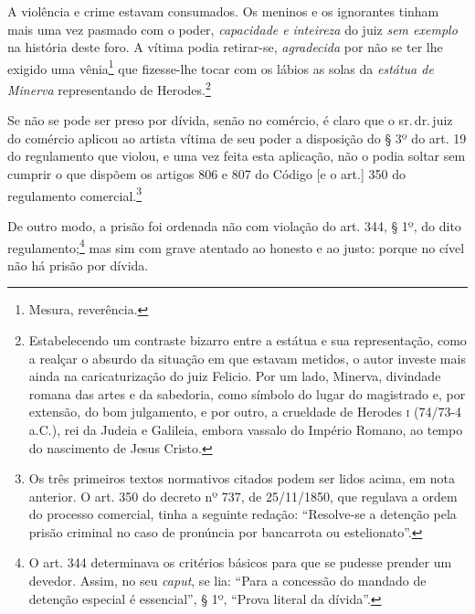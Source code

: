A violência e crime estavam consumados. Os meninos e os ignorantes
tinham mais uma vez pasmado com o poder, \emph{capacidade e}
\emph{inteireza} do juiz \emph{sem exemplo} na história deste foro. A
vítima podia retirar-se, \emph{agradecida} por não se ter lhe exigido
uma vênia\footnote{ Mesura, reverência.} que fizesse-lhe tocar com os
lábios as solas da \emph{estátua de Minerva} representando de
Herodes.\footnote{ Estabelecendo um contraste bizarro entre a estátua e
  sua representação, como a realçar o absurdo da situação em que estavam
  metidos, o autor investe mais ainda na caricaturização do juiz
  Felicio. Por um lado, Minerva, divindade romana das artes e da
  sabedoria, como símbolo do lugar do magistrado e, por extensão, do bom
  julgamento, e por outro, a crueldade de Herodes \textsc{i} (74/73-4\,
  a.C.), rei da Judeia e Galileia, embora vassalo do Império Romano, ao
  tempo do nascimento de Jesus Cristo.}

Se não se pode ser preso por dívida, senão no comércio, é claro que o
sr.\,dr.\,juiz do comércio aplicou ao artista vítima de seu poder a
disposição do § 3º do art. 19 do regulamento que violou, e uma vez feita
esta aplicação, não o podia soltar sem cumprir o que dispõem os artigos
806 e 807 do Código {[}e o art.{]} 350 do regulamento
comercial.\footnote{ Os três primeiros textos normativos citados podem
  ser lidos acima, em nota anterior. O art. 350 do decreto nº 737, de
  25/11/1850, que regulava a ordem do processo comercial, tinha a
  seguinte redação: ``Resolve-se a detenção pela prisão criminal no caso
  de pronúncia por bancarrota ou estelionato''.}

De outro modo, a prisão foi ordenada não com violação do art. 344, § 1º,
do dito regulamento;\footnote{ O art. 344 determinava os critérios
  básicos para que se pudesse prender um devedor. Assim, no seu
  \emph{caput}, se lia: ``Para a concessão do mandado de detenção
  especial é essencial'', § 1º, ``Prova literal da dívida''.} mas sim com
grave atentado ao honesto e ao justo: porque no cível não há prisão por
dívida.

